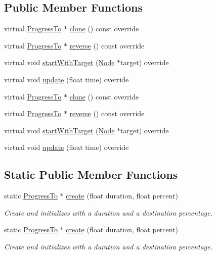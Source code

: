 \subsection*{Public Member Functions}
\begin{DoxyCompactItemize}
\item 
virtual \hyperlink{classProgressTo}{Progress\+To} $\ast$ \hyperlink{classProgressTo_a55a418dbd387fca470d425df87291b0b}{clone} () const override
\item 
virtual \hyperlink{classProgressTo}{Progress\+To} $\ast$ \hyperlink{classProgressTo_af09c310239f700015d1875bdaf6dc8ae}{reverse} () const override
\item 
virtual void \hyperlink{classProgressTo_a9533f1dab48b9243b170f463b8498f07}{start\+With\+Target} (\hyperlink{classNode}{Node} $\ast$target) override
\item 
virtual void \hyperlink{classProgressTo_afce4ccb876eb502a7c1fa7521cb06099}{update} (float time) override
\item 
virtual \hyperlink{classProgressTo}{Progress\+To} $\ast$ \hyperlink{classProgressTo_a993bf559112f3bbe3f4d38027711fd8e}{clone} () const override
\item 
virtual \hyperlink{classProgressTo}{Progress\+To} $\ast$ \hyperlink{classProgressTo_ac8120eda623416e455871c5e25bac87e}{reverse} () const override
\item 
virtual void \hyperlink{classProgressTo_ac32af7881cffffec6eb7dcfcb0a18c6b}{start\+With\+Target} (\hyperlink{classNode}{Node} $\ast$target) override
\item 
virtual void \hyperlink{classProgressTo_a33f0be899372bd32644de3d87a0308f3}{update} (float time) override
\end{DoxyCompactItemize}
\subsection*{Static Public Member Functions}
\begin{DoxyCompactItemize}
\item 
static \hyperlink{classProgressTo}{Progress\+To} $\ast$ \hyperlink{classProgressTo_ac6129d29666546255f5462b5e5bf471f}{create} (float duration, float percent)
\begin{DoxyCompactList}\small\item\em Create and initializes with a duration and a destination percentage. \end{DoxyCompactList}\item 
static \hyperlink{classProgressTo}{Progress\+To} $\ast$ \hyperlink{classProgressTo_a2c8c9ee63137e50754cb231c3fdd4f5d}{create} (float duration, float percent)
\begin{DoxyCompactList}\small\item\em Create and initializes with a duration and a destination percentage. \end{DoxyCompactList}\end{DoxyCompactItemize}
